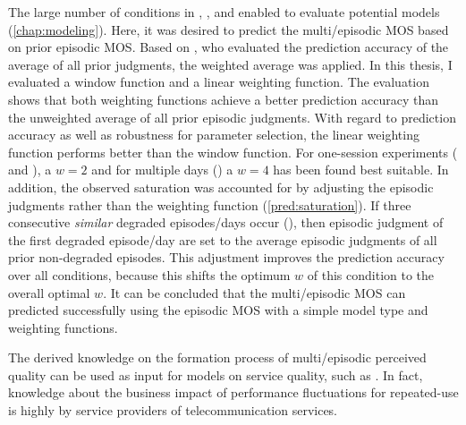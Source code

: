 The large number of conditions in , \EIIa{}, and  enabled to evaluate potential models (\autoref{chap:modeling}).
Here, it was desired to predict the multi\-/episodic \ac{MOS} based on prior episodic \ac{MOS}.
Based on \citet{moller_single-call_2011}, who evaluated the prediction accuracy of the average of all prior judgments, the weighted average was applied.
In this thesis, I evaluated a window function and a linear weighting function.
The evaluation shows that both weighting functions achieve a better prediction accuracy than the unweighted average of all prior episodic judgments.
With regard to prediction accuracy as well as robustness for parameter selection, the linear weighting function performs better than the window function.
For one-session experiments ( and \EIIa{}), a $\mathit{w}=2$ and for multiple days () a $\mathit{w}=4$ has been found best suitable.
In addition, the observed saturation was accounted for by adjusting the episodic judgments rather than the weighting function (\autoref{pred:saturation}).
If three consecutive \emph{similar} degraded episodes/days occur (), then episodic judgment of the first degraded episode/day are set to the average episodic judgments of all prior non-degraded episodes.
This adjustment improves the prediction accuracy over all conditions, because this shifts the optimum $\mathit{w}$ of this condition to the overall optimal $\mathit{w}$.
It can be concluded that the multi\-/episodic \ac{MOS} can predicted successfully using the episodic \ac{MOS} with a simple model type and weighting functions.

The derived knowledge on the formation process of multi\-/episodic perceived quality can be used as input for models on service quality, such as \citet{parasuraman_conceptual_1985}.
In fact, knowledge about the business impact of performance fluctuations for repeated-use is highly by service providers of telecommunication services.

